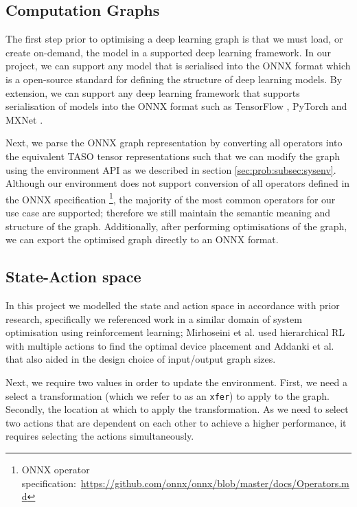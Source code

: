 \subsection{Computation Graphs}
The first step prior to optimising a deep learning graph is that we must load, or create on-demand, the model in a supported deep learning framework. In our project, we can support any model that is serialised into the ONNX \cite{bai2019onnx} format which is a open-source standard for defining the structure of deep learning models. By extension, we can support any deep learning framework that supports serialisation of models into the ONNX format such as TensorFlow \cite{tensorflow2015-whitepaper}, PyTorch \cite{pytorch} and MXNet \cite{chen2015mxnet}.

Next, we parse the ONNX graph representation by converting all operators into the equivalent TASO tensor representations such that we can modify the graph using the environment API as we described in section \ref{sec:prob:subsec:sysenv}. Although our environment does not support conversion of all operators defined in the ONNX specification \footnote{ONNX operator specification:~\url{https://github.com/onnx/onnx/blob/master/docs/Operators.md}}, the majority of the most common operators for our use case are supported; therefore we still maintain the semantic meaning and structure of the graph. Additionally, after performing optimisations of the graph, we can export the optimised graph directly to an ONNX format.

\subsection{State-Action space}
\label{sec:prob:subsec:sap}
In this project we modelled the state and action space in accordance with prior research, specifically we referenced work in a similar domain of system optimisation using reinforcement learning; Mirhoseini et al. \cite{mirhoseini2018hierarchical} used hierarchical RL with multiple actions to find the optimal device placement and Addanki et al. \cite{addanki2019placeto} that also aided in the design choice of input/output graph sizes.

Next, we require two values in order to update the environment. First, we need a select a transformation (which we refer to as an \texttt{xfer}) to apply to the graph. Secondly, the location at which to apply the transformation. As we need to select two actions that are dependent on each other to achieve a higher performance, it requires selecting the actions simultaneously.


